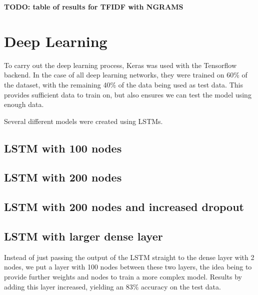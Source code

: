 \documentclass[12pt]{article}
\begin{document}
\textbf{TODO: table of results for TFIDF with NGRAMS}

\section{Deep Learning}
To carry out the deep learning process, Keras was used with the Tensorflow backend.
In the case of all deep learning networks, they were trained on 60\% of the dataset, with the remaining 40\% of the data being used as test data.
This provides sufficient data to train on, but also ensures we can test the model using enough data.

Several different models were created using LSTMs.

\subsection{LSTM with 100 nodes}

\subsection{LSTM with 200 nodes}

\subsection{LSTM with 200 nodes and increased dropout}

\subsection{LSTM with larger dense layer}
Instead of just passing the output of the LSTM straight to the dense layer with 2 nodes, we put a layer with 100 nodes between these two layers,
the idea being to provide further weights and nodes to train a more complex model. Results by adding this layer increased, yielding an 83\% accuracy on the test data.
\end{document}
